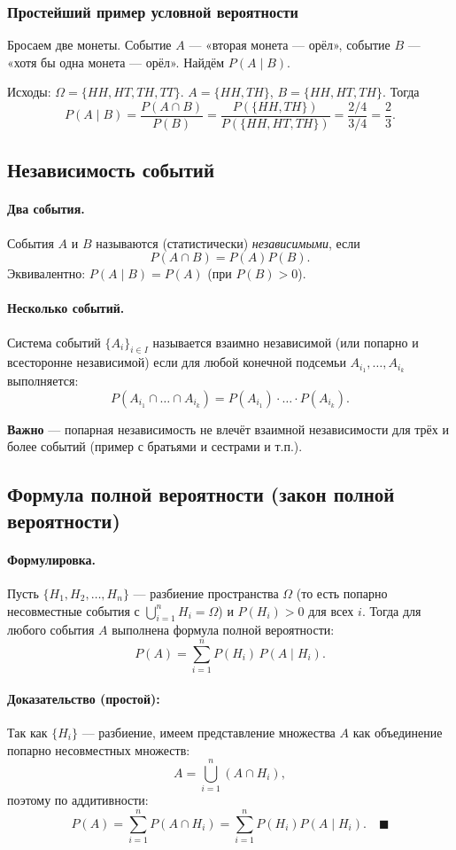\subsubsection*{Простейший пример условной вероятности}
Бросаем две монеты. Событие $A$ — «вторая монета — орёл», событие $B$ — «хотя бы одна монета — орёл». Найдём $P(A\mid B)$.

Исходы: $\Omega=\{HH,HT,TH,TT\}$.  
$A=\{HH,TH\}$, $B=\{HH,HT,TH\}$. Тогда
\[
P(A\mid B) = \frac{P(A\cap B)}{P(B)} = \frac{P(\{HH,TH\})}{P(\{HH,HT,TH\})} = \frac{2/4}{3/4} = \frac{2}{3}.
\]

\subsection{Независимость событий}
\paragraph{Два события.} События $A$ и $B$ называются (статистически) \emph{независимыми}, если
\[
P(A\cap B) = P(A)P(B).
\]
Эквивалентно: $P(A\mid B) = P(A)$ (при $P(B)>0$).

\paragraph{Несколько событий.} Система событий $\{A_i\}_{i\in I}$ называется взаимно независимой (или попарно и всесторонне независимой) если для любой конечной подсемьи $A_{i_1},\dots,A_{i_k}$ выполняется:
\[
P(A_{i_1}\cap \dots \cap A_{i_k}) = P(A_{i_1})\cdot \ldots \cdot P(A_{i_k}).
\]

\medskip
\textbf{Важно} — попарная независимость не влечёт взаимной независимости для трёх и более событий (пример с братьями и сестрами и т.п.).

\subsection{Формула полной вероятности (закон полной вероятности)}
\paragraph{Формулировка.} Пусть $\{H_1, H_2, \dots, H_n\}$ — разбиение пространства $\Omega$ (то есть попарно несовместные события с $\bigcup_{i=1}^n H_i = \Omega$) и $P(H_i)>0$ для всех $i$. Тогда для любого события $A$ выполнена формула полной вероятности:
\[
P(A) = \sum_{i=1}^n P(H_i) \, P(A\mid H_i).
\]

\paragraph{Доказательство (простой):} Так как $\{H_i\}$ — разбиение, имеем представление множества $A$ как объединение попарно несовместных множеств:
\[
A = \bigcup_{i=1}^n (A\cap H_i),
\]
поэтому по аддитивности:
\[
P(A) = \sum_{i=1}^n P(A\cap H_i) = \sum_{i=1}^n P(H_i) P(A\mid H_i).
\quad\blacksquare
\]

